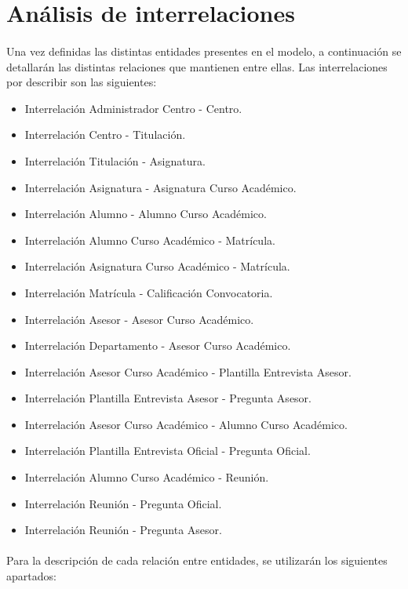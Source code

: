 \section{Análisis de interrelaciones}

   \paragraph{}Una vez definidas las distintas entidades presentes en el
   modelo, a continuación se detallarán las distintas relaciones que mantienen
   entre ellas. Las interrelaciones por describir son las siguientes:

   \begin{itemize}
    \item Interrelación Administrador Centro - Centro.
    \item Interrelación Centro - Titulación.
    \item Interrelación Titulación - Asignatura.
    \item Interrelación Asignatura - Asignatura Curso Académico.
    \item Interrelación Alumno - Alumno Curso Académico.
    \item Interrelación Alumno Curso Académico - Matrícula.
    \item Interrelación Asignatura Curso Académico - Matrícula.
    \item Interrelación Matrícula - Calificación Convocatoria.
    \item Interrelación Asesor - Asesor Curso Académico.
    \item Interrelación Departamento - Asesor Curso Académico.
    \item Interrelación Asesor Curso Académico - Plantilla Entrevista Asesor.
    \item Interrelación Plantilla Entrevista Asesor - Pregunta Asesor.
    \item Interrelación Asesor Curso Académico - Alumno Curso Académico.
    \item Interrelación Plantilla Entrevista Oficial - Pregunta Oficial.
    \item Interrelación Alumno Curso Académico - Reunión.
    \item Interrelación Reunión - Pregunta Oficial.
    \item Interrelación Reunión - Pregunta Asesor.
   \end{itemize}

   \paragraph{}Para la descripción de cada relación entre entidades, se
   utilizarán los siguientes apartados:

